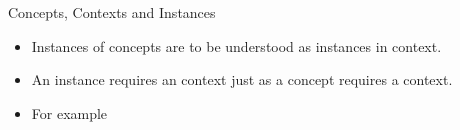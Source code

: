 \begin{frame}{Concepts, Contexts  and Instances}
\begin{itemize}
\item Instances of concepts are to be understood as instances in context.
\item An instance requires an context just as a concept requires a context.
\pause
\item For example 
\end{itemize}
\end{frame}




